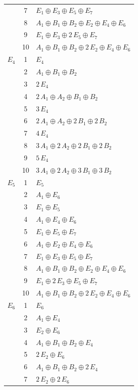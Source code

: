 \documentclass[11pt]{article}
\begin{document}
\begin{longtable}{l c p{}}
 & 7 & $E_{1}\oplus E_{3}\oplus E_{5}\oplus E_{7}$\\
 & 8 & $A_{1}\oplus B_{1}\oplus B_{2}\oplus E_{2}\oplus E_{4}\oplus E_{6}$\\
 & 9 & $E_{1}\oplus E_{3}\oplus 2\,E_{5}\oplus E_{7}$\\
 & 10 & $A_{1}\oplus B_{1}\oplus B_{2}\oplus 2\,E_{2}\oplus E_{4}\oplus E_{6}$\\
\hline
$E_{4}$ & 1 & $E_{4}$\\
 & 2 & $A_{1}\oplus B_{1}\oplus B_{2}$\\
 & 3 & $2\,E_{4}$\\
 & 4 & $2\,A_{1}\oplus A_{2}\oplus B_{1}\oplus B_{2}$\\
 & 5 & $3\,E_{4}$\\
 & 6 & $2\,A_{1}\oplus A_{2}\oplus 2\,B_{1}\oplus 2\,B_{2}$\\
 & 7 & $4\,E_{4}$\\
 & 8 & $3\,A_{1}\oplus 2\,A_{2}\oplus 2\,B_{1}\oplus 2\,B_{2}$\\
 & 9 & $5\,E_{4}$\\
 & 10 & $3\,A_{1}\oplus 2\,A_{2}\oplus 3\,B_{1}\oplus 3\,B_{2}$\\
\hline
$E_{5}$ & 1 & $E_{5}$\\
 & 2 & $A_{1}\oplus E_{6}$\\
 & 3 & $E_{1}\oplus E_{5}$\\
 & 4 & $A_{1}\oplus E_{4}\oplus E_{6}$\\
 & 5 & $E_{1}\oplus E_{5}\oplus E_{7}$\\
 & 6 & $A_{1}\oplus E_{2}\oplus E_{4}\oplus E_{6}$\\
 & 7 & $E_{1}\oplus E_{3}\oplus E_{5}\oplus E_{7}$\\
 & 8 & $A_{1}\oplus B_{1}\oplus B_{2}\oplus E_{2}\oplus E_{4}\oplus E_{6}$\\
 & 9 & $E_{1}\oplus 2\,E_{3}\oplus E_{5}\oplus E_{7}$\\
 & 10 & $A_{1}\oplus B_{1}\oplus B_{2}\oplus 2\,E_{2}\oplus E_{4}\oplus E_{6}$\\
\hline
$E_{6}$ & 1 & $E_{6}$\\
 & 2 & $A_{1}\oplus E_{4}$\\
 & 3 & $E_{2}\oplus E_{6}$\\
 & 4 & $A_{1}\oplus B_{1}\oplus B_{2}\oplus E_{4}$\\
 & 5 & $2\,E_{2}\oplus E_{6}$\\
 & 6 & $A_{1}\oplus B_{1}\oplus B_{2}\oplus 2\,E_{4}$\\
 & 7 & $2\,E_{2}\oplus 2\,E_{6}$\\

\end{longtable}
\end{document}
